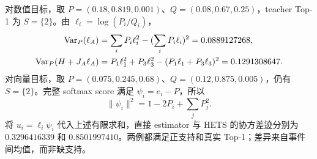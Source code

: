对数值目标，取 $P=(0.18,0.819,0.001)$、$Q=(0.08,0.67,0.25)$，teacher Top-1 为 $S=\{2\}$。由 $\ell_i=\log(P_i/Q_i)$，
\begin{align}
\operatorname{Var}_P(\ell_A)&=\sum_iP_i\ell_i^2-(\sum_iP_i\ell_i)^2=0.0889127268,\\
\operatorname{Var}_P(H+J_A\ell_A)&=P_1\ell_1^2+P_3\ell_3^2-(P_1\ell_1+P_3\ell_3)^2=0.1291308647.
\end{align}
对向量目标，取 $P=(0.075,0.245,0.68)$、$Q=(0.12,0.875,0.005)$，仍有 $S=\{2\}$。完整 softmax score 满足 $\psi_i=e_i-P$，所以
\begin{equation}
\|\psi_i\|^2=1-2P_i+\sum_jP_j^2.
\end{equation}
将 $u_i=\ell_i\psi_i$ 代入上述有限求和，直接 estimator 与 HETS 的协方差迹分别为 $0.3296416339$ 和 $0.8501997410$。两例都满足正支持和真实 Top-1；差异来自事件间均值，而非缺支持。
